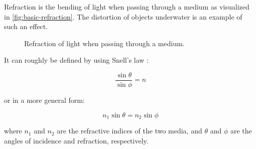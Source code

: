 Refraction is the bending of light when passing through a medium as visualized in \autoref{fig:basic-refraction}. The distortion of objects underwater is an example of such an effect.

\begin{figure}[H]
  \centering
  \caption{Refraction of light when passing through a medium.}
  \label{fig:basic-refraction}
\end{figure}

It can roughly be defined by using Snell's law \cite{fowles1989introduction}:

\begin{equation}
  \label{eqn:snells-law}
  \frac{\sin \theta}{\sin \phi} = n
\end{equation}

or in a more general form:

\begin{equation}
  \label{eqn:snells-law-general}
  n_1 \sin \theta = n_2 \sin \phi
\end{equation}

where $n_1$ and $n_2$ are the refractive indices of the two media, and $\theta$ and $\phi$ are the angles of incidence and refraction, respectively.

